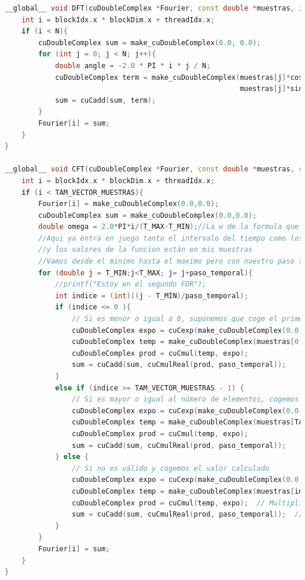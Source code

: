 \documentclass[12pt]{article}
\begin{document}
\begin{lstlisting}[language=C++, basicstyle=\ttfamily\small, frame=single]
__global__ void DFT(cuDoubleComplex *Fourier, const double *muestras, int N){
    int i = blockIdx.x * blockDim.x + threadIdx.x;
    if (i < N){
        cuDoubleComplex sum = make_cuDoubleComplex(0.0, 0.0);
        for (int j = 0; j < N; j++){
            double angle = -2.0 * PI * i * j / N;
            cuDoubleComplex term = make_cuDoubleComplex(muestras[j]*cos(angle),
                                                        muestras[j]*sin(angle));
            sum = cuCadd(sum, term);
        }
        Fourier[i] = sum;
    }
}

__global__ void CFT(cuDoubleComplex *Fourier, const double *muestras, const int TAM_VECTOR_MUESTRAS, const double paso_temporal){
    int i = blockIdx.x * blockDim.x + threadIdx.x;
    if (i < TAM_VECTOR_MUESTRAS){
        Fourier[i] = make_cuDoubleComplex(0.0,0.0);
        cuDoubleComplex sum = make_cuDoubleComplex(0.0,0.0);
        double omega = 2.0*PI*i/(T_MAX-T_MIN);//La w de la formula que es el omega
        //Aqui ya entra en juego tanto el intervalo del tiempo como los valores que dan la funcion, es decir el tiempo esta entre -1 y 1
        //y los valores de la funcion están en mis muestras
        //Vamos desde el minimo hasta el maximo pero con nuestro paso temporal para tomar fourier lo más preciso posible
        for (double j = T_MIN;j<T_MAX; j= j+paso_temporal){
            //printf("Estoy en el segundo FOR");
            int indice = (int)((j - T_MIN)/paso_temporal);
            if (indice <= 0 ){
                // Si es menor o igual a 0, suponemos que coge el primer elemento
                cuDoubleComplex expo = cuCexp(make_cuDoubleComplex(0.0, -omega * j));  
                cuDoubleComplex temp = make_cuDoubleComplex(muestras[0], 0.0);  
                cuDoubleComplex prod = cuCmul(temp, expo);  
                sum = cuCadd(sum, cuCmulReal(prod, paso_temporal));  
            }
            else if (indice >= TAM_VECTOR_MUESTRAS - 1) { 
                // Si es mayor o igual al número de elementos, cogemos el último
                cuDoubleComplex expo = cuCexp(make_cuDoubleComplex(0.0, -omega * j));  
                cuDoubleComplex temp = make_cuDoubleComplex(muestras[TAM_VECTOR_MUESTRAS - 1], 0.0);  
                cuDoubleComplex prod = cuCmul(temp, expo);  
                sum = cuCadd(sum, cuCmulReal(prod, paso_temporal));  
            } else {
                // Si no es válido y cogemos el valor calculado
                cuDoubleComplex expo = cuCexp(make_cuDoubleComplex(0.0, -omega * j));  // Usamos la función cuCexp para la exponencial
                cuDoubleComplex temp = make_cuDoubleComplex(muestras[indice], 0.0);  // Tomamos la muestra correspondiente
                cuDoubleComplex prod = cuCmul(temp, expo);  // Multiplicamos la muestra por la exponencial
                sum = cuCadd(sum, cuCmulReal(prod, paso_temporal));  // Acumulamos el resultado, aplicando el paso temporal
            }
        }
        Fourier[i] = sum;
    }    
}


\end{lstlisting}
\end{document}
